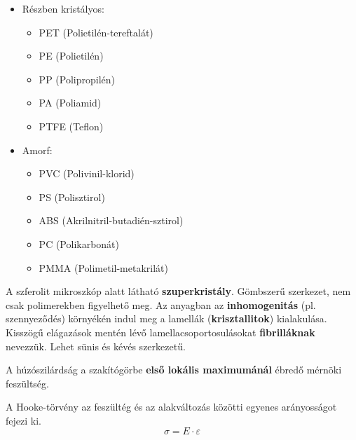 \documentclass[12pt,a4paper]{article}       %
\begin{document}
\begin{tcbitemize}
  \tcbitem[title={\# \thetcbrasternum{} –
        Soroljon fel 3 részben-kristályos és 3 amorf polimer típust!
      }]
  \setlength{\columnsep}{-1cm}
  \begin{multicols}{2}
    \begin{itemize}
      \item Részben kristályos:
            \begin{itemize}
              \item PET (Polietilén-tereftalát)
              \item PE (Polietilén)
              \item PP (Polipropilén)
              \item PA (Poliamid)
              \item PTFE (Teflon)
            \end{itemize}
      \item Amorf:
            \begin{itemize}
              \item PVC (Polivinil-klorid)
              \item PS (Polisztirol)
              \item ABS (Akrilnitril-butadién-sztirol)
              \item PC (Polikarbonát)
              \item PMMA (Polimetil-metakrilát)
            \end{itemize}
    \end{itemize}
  \end{multicols}



  \tcbitem[title={\# \thetcbrasternum{} –
        Mi a szferolit?
      }]
  A szferolit mikroszkóp alatt látható \textbf{szuperkristály}. Gömbszerű
  szerkezet, nem csak polimerekben figyelhető meg. Az anyagban az
  \textbf{inhomogenitás} (pl. szennyeződés) környékén indul meg a lamellák
  (\textbf{krisztallitok}) kialakulása. Kisszögű elágazások mentén lévő
  lamellacsoportosulásokat \textbf{fibrilláknak} nevezzük. Lehet sünis és kévés
  szerkezetű.



  \tcbitem[title={\# \thetcbrasternum{} –
        Hogyan számítható a polimerek húzószilárdsága?
      }]
  A húzószilárdság a szakítógörbe \textbf{első lokális maximumánál} ébredő
  mérnöki feszültség.



  \tcbitem[title={\# \thetcbrasternum{} –
        Írja fel a Hooke-törvényt (szilárd testekre vonatkozólag)!
      }]
  A Hooke-törvény az feszültég és az alakváltozás közötti egyenes arányosságot
  fejezi ki.
  \[
    \sigma = E \cdot \varepsilon
  \]




\end{tcbitemize}
\end{document}

